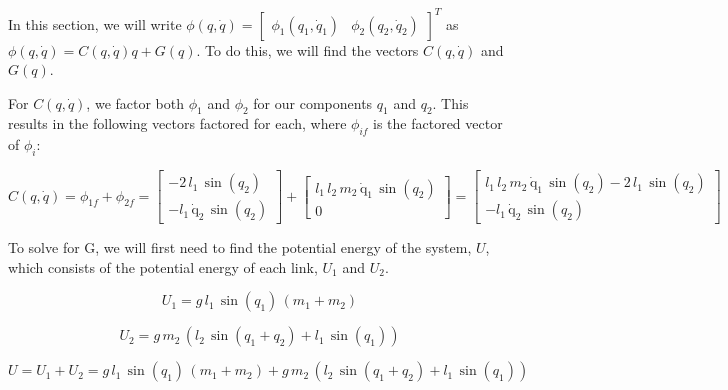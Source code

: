 \documentclass{article}
\begin{document}
In this section, we will write $\phi(q, \dot{q})=\begin{bmatrix} \phi_1(q_1, \dot{q}_1) & \phi_2(q_2, \dot{q}_2) \end{bmatrix}^T$ as $\phi(q, \dot{q})= C(q, \dot{q})q + G(q)$. To do this, we will find the vectors $C(q, \dot{q})$ and $G(q)$.

For $C(q, \dot{q})$, we factor both $\phi_1$ and $\phi_2$ for our components $q_1$ and $q_2$. This results in the following vectors factored for each, where $\phi_{if}$ is the factored vector of $\phi_i$:

\begin{equation}
    C(q, \dot{q}) = \phi_{1f} + \phi_{2f} = \begin{bmatrix}
        -2\,l_1 \,\sin \left(q_2 \right)\\
        -l_1 \,\mathrm{\dot{q}_2}\,\sin \left(q_2 \right)
        \end{bmatrix} + \begin{bmatrix}
            l_1 \,l_2 \,m_2 \,\mathrm{\dot{q}_1}\,\sin \left(q_2 \right)\\
            0
            \end{bmatrix} = \begin{bmatrix}
                l_1 \,l_2 \,m_2 \,\mathrm{\dot{q}_1}\,\sin \left(q_2 \right)-2\,l_1 \,\sin \left(q_2 \right)\\
                -l_1 \,\mathrm{\dot{q}_2}\,\sin \left(q_2 \right)
                \end{bmatrix}
\end{equation}

To solve for G, we will first need to find the potential energy of the system, $U$, which consists of the potential energy of each link, $U_1$ and $U_2$.

\begin{equation}
    U_1 = g\,l_1 \,\sin \left(q_1 \right)\,{\left(m_1 +m_2 \right)}
\end{equation}

\begin{equation}
    U_2 = g\,m_2 \,{\left(l_2 \,\sin \left(q_1 +q_2 \right)+l_1 \,\sin \left(q_1 \right)\right)}
\end{equation}

\begin{equation}
    U = U_1 + U_2 = g\,l_1 \,\sin \left(q_1 \right)\,{\left(m_1 +m_2 \right)} + g\,m_2 \,{\left(l_2 \,\sin \left(q_1 +q_2 \right)+l_1 \,\sin \left(q_1 \right)\right)}
\end{equation}
\end{document}
